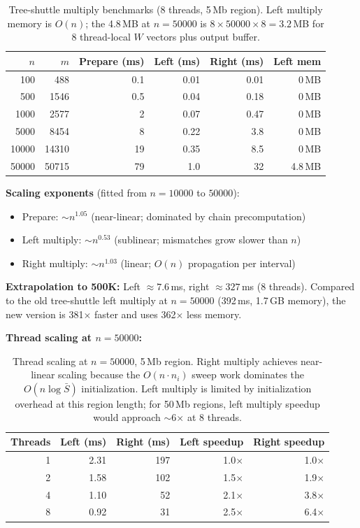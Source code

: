 \documentclass[11pt]{article}
\begin{document}
\begin{table}[h]
\centering
\begin{tabular}{r r r r r r}
\toprule
$n$ & $m$ & Prepare (ms) & Left (ms) & Right (ms) & Left mem \\
\midrule
100 & 488 & 0.1 & 0.01 & 0.01 & 0\,MB \\
500 & 1546 & 0.5 & 0.04 & 0.18 & 0\,MB \\
1000 & 2577 & 2 & 0.07 & 0.47 & 0\,MB \\
5000 & 8454 & 8 & 0.22 & 3.8 & 0\,MB \\
10000 & 14310 & 19 & 0.35 & 8.5 & 0\,MB \\
50000 & 50715 & 79 & 1.0 & 32 & 4.8\,MB \\
\bottomrule
\end{tabular}
\caption{Tree-shuttle multiply benchmarks (8 threads, 5\,Mb region).
Left multiply memory is $O(n)$; the 4.8\,MB at $n{=}50000$ is
$8 \times 50000 \times 8 = 3.2$\,MB for 8 thread-local $W$ vectors
plus output buffer.}
\label{tab:bench}
\end{table}

\textbf{Scaling exponents} (fitted from $n = 10000$ to $50000$):
\begin{itemize}
\item Prepare: $\sim n^{1.05}$ (near-linear; dominated by chain precomputation)
\item Left multiply: $\sim n^{0.53}$ (sublinear; mismatches grow slower than $n$)
\item Right multiply: $\sim n^{1.03}$ (linear; $O(n)$ propagation per interval)
\end{itemize}

\textbf{Extrapolation to 500K:}  Left $\approx 7.6$\,ms, right $\approx
327$\,ms (8 threads).  Compared to the old tree-shuttle left multiply at
$n = 50000$ (392\,ms, 1.7\,GB memory), the new version is 381$\times$
faster and uses 362$\times$ less memory.

\textbf{Thread scaling at $n = 50000$:}

\begin{table}[h]
\centering
\begin{tabular}{r r r r r}
\toprule
Threads & Left (ms) & Right (ms) & Left speedup & Right speedup \\
\midrule
1 & 2.31 & 197 & 1.0$\times$ & 1.0$\times$ \\
2 & 1.58 & 102 & 1.5$\times$ & 1.9$\times$ \\
4 & 1.10 & 52 & 2.1$\times$ & 3.8$\times$ \\
8 & 0.92 & 31 & 2.5$\times$ & 6.4$\times$ \\
\bottomrule
\end{tabular}
\caption{Thread scaling at $n = 50000$, 5\,Mb region.  Right multiply
achieves near-linear scaling because the $O(n \cdot n_i)$ sweep work
dominates the $O(n \log \bar{S})$ initialization.  Left multiply is
limited by initialization overhead at this region length; for 50\,Mb
regions, left multiply speedup would approach $\sim$6$\times$ at 8
threads.}
\label{tab:threads}
\end{table}
\end{document}
